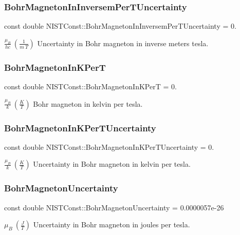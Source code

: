 \subsubsection{\texorpdfstring{Bohr\+Magneton\+In\+Inversem\+Per\+T\+Uncertainty}{BohrMagnetonInInversemPerTUncertainty}}
{\footnotesize\ttfamily const double N\+I\+S\+T\+Const\+::\+Bohr\+Magneton\+In\+Inversem\+Per\+T\+Uncertainty = 0.}

$\frac{\mu_B}{hc} \ (\frac{1}{m\ T})$ Uncertainty in Bohr magneton in inverse meters tesla. \mbox{\label{group___bohr_magneton_ga4fcb81eff2823748ae5fced898ecc0ec}} 
\subsubsection{\texorpdfstring{Bohr\+Magneton\+In\+K\+PerT}{BohrMagnetonInKPerT}}
{\footnotesize\ttfamily const double N\+I\+S\+T\+Const\+::\+Bohr\+Magneton\+In\+K\+PerT = 0.}

$\frac{\mu_B}{k} \ (\frac{K}{T})$ Bohr magneton in kelvin per tesla. \mbox{\label{group___bohr_magneton_ga25a3b7882df7b01e29f7d0ec090a6f91}} 
\subsubsection{\texorpdfstring{Bohr\+Magneton\+In\+K\+Per\+T\+Uncertainty}{BohrMagnetonInKPerTUncertainty}}
{\footnotesize\ttfamily const double N\+I\+S\+T\+Const\+::\+Bohr\+Magneton\+In\+K\+Per\+T\+Uncertainty = 0.}

$\frac{\mu_B}{k} \ (\frac{K}{T})$ Uncertainty in Bohr magneton in kelvin per tesla. \mbox{\label{group___bohr_magneton_gaf2591aab0321fec9056cc1a8479cb05b}} 
\subsubsection{\texorpdfstring{Bohr\+Magneton\+Uncertainty}{BohrMagnetonUncertainty}}
{\footnotesize\ttfamily const double N\+I\+S\+T\+Const\+::\+Bohr\+Magneton\+Uncertainty = 0.\+0000057e-\/26}

$\mu_B \ (\frac{J}{T})$ Uncertainty in Bohr magneton in joules per tesla. 